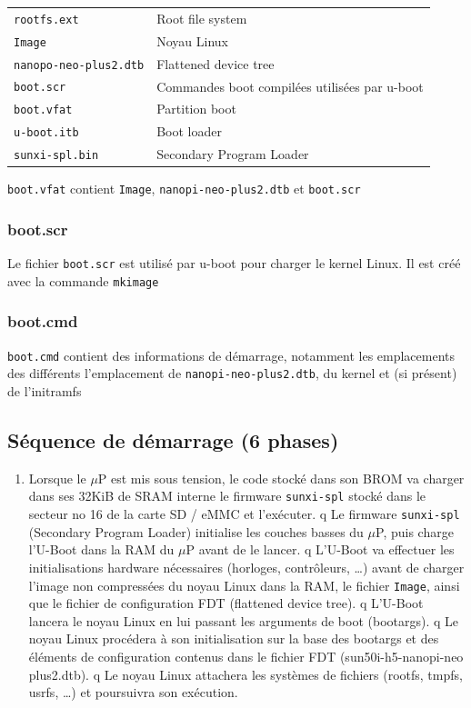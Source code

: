 \documentclass[resume]{subfiles}
\begin{document}
\begin{enumerate}
\begin{table}[H]
\begin{tabular}{ll}
\verb!rootfs.ext! & Root file system\\
\verb!Image! & Noyau Linux\\
\verb!nanopo-neo-plus2.dtb! & Flattened device tree\\
\verb!boot.scr! & Commandes boot compilées utilisées par u-boot\\
\verb!boot.vfat! & Partition boot\\
\verb!u-boot.itb! & Boot loader\\
\verb!sunxi-spl.bin! & Secondary Program Loader
\end{tabular}
\end{table}
\verb!boot.vfat! contient \verb!Image!, \verb!nanopi-neo-plus2.dtb! et \verb!boot.scr!
\subsubsection{boot.scr}
Le fichier \verb!boot.scr! est utilisé par u-boot pour charger le kernel Linux. Il est créé avec la commande \verb!mkimage!
\subsubsection{boot.cmd}
\verb!boot.cmd! contient des informations de démarrage, notamment les emplacements des différents l'emplacement de \verb!nanopi-neo-plus2.dtb!, du kernel et (si présent) de l'initramfs
\subsection{Séquence de démarrage (6 phases)}
\begin{enumerate}
\item Lorsque le $\mu$P est mis sous tension, le code stocké dans son BROM va charger 
dans ses 32KiB de SRAM interne le firmware \verb!sunxi-spl! stocké dans le 
secteur no 16 de la carte SD / eMMC et l’exécuter. 
q Le firmware \verb!sunxi-spl! (Secondary Program Loader) initialise les couches 
basses du $\mu$P, puis charge l'U-Boot dans la RAM du $\mu$P avant de le lancer.
q L'U-Boot va effectuer les initialisations hardware nécessaires (horloges, 
contrôleurs, …) avant de charger l’image non compressées du noyau Linux dans 
la RAM, le fichier \verb!Image!, ainsi que le fichier de configuration FDT (flattened
device tree).
q L'U-Boot lancera le noyau Linux en lui passant les arguments de boot (bootargs).
q Le noyau Linux procédera à son initialisation sur la base des bootargs et des 
éléments de configuration contenus dans le fichier FDT (sun50i-h5-nanopi-neo plus2.dtb).
q Le noyau Linux attachera les systèmes de fichiers (rootfs, tmpfs, usrfs, …) et 
poursuivra son exécution.
\end{enumerate}





\end{enumerate}
\end{document}
